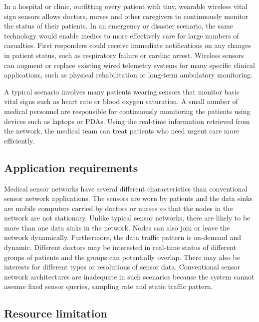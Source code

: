 In a hospital or clinic, outfitting every patient with tiny,
wearable wireless vital sign sensors allows doctors, nurses and other
caregivers to continuously monitor the status of their patients.  In
an emergency or disaster scenario, the same technology would enable
medics to more effectively care for large numbers of casualties.
First responders could receive immediate notifications on any changes
in patient status, such as respiratory failure or cardiac arrest.
Wireless sensors can augment or replace existing wired telemetry
systems for many specific clinical applications, such as physical
rehabilitation or long-term ambulatory monitoring.

A typical scenario involves many patients wearing sensors that monitor basic
vital signs such as heart rate or blood oxygen saturation. A small number of
medical personnel are responsible for continuously monitoring the patients
using devices such as laptops or PDAs. Using the real-time information
retrieved from the network, the medical team can treat
patients who need urgent care more efficiently.


\subsection{Application requirements}

Medical sensor networks have several different characteristics than
conventional sensor network applications. The sensors are worn by patients and the
data sinks are mobile computers carried by doctors or nurses so that the nodes
in the network are not stationary. Unlike typical sensor networks, there are
likely to be more than one data sinks in the network. Nodes can also join or
leave the network dynamically. Furthermore, the data traffic pattern is
on-demand and dynamic. Different doctors may be interested in real-time status
of different groups of patients and the groups can potentially overlap. There may
also be interests for different types or resolutions of sensor data.
Conventional sensor network architectures are inadequate in such scenarios
because the system cannot assume fixed sensor queries, sampling rate and
static traffic pattern. 



\subsection{Resource limitation}

